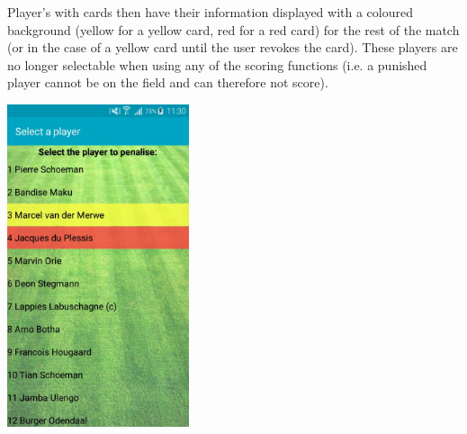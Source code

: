 \documentclass[hidelinks,a4paper,12pt]{article}
\begin{document}
	Player's with cards then have their information displayed with a coloured background (yellow for a yellow card, red for a red card) for the rest of the match (or in the case of a yellow card until the user revokes the card). These players are no longer selectable when using any of the scoring functions (i.e. a punished player cannot be on the field and can therefore not score).

	\begin{center}
  		\includegraphics[width=0.4\textwidth] {./images/discipline_display.jpg}\\[0.4cm]
	\end{center}
\end{document}
